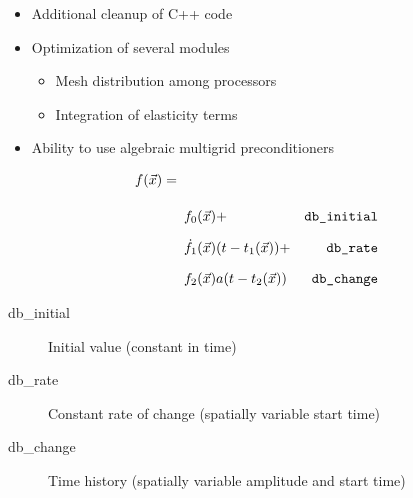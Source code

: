 \documentclass[pdftex,cig,slideColor]{pp4slides}
\begin{document}
  \summary{}

  \begin{itemize}
  \item Additional cleanup of C++ code
  \item Optimization of several modules
    \begin{itemize}
    \item Mesh distribution among processors
    \item Integration of elasticity terms
    \end{itemize}
  \item Ability to use algebraic multigrid preconditioners
 \end{itemize}
    

  
  \begin{equation*}
    \begin{split}
      f(\vec{x}) =& \\[10pt]
      & \begin{array}{lr}
        f_{0}(\vec{x}) + & \textrm{{\tt db\_initial}}\\[10pt]
        \dot{f}_{1}(\vec{x}) (t-t_{1}(\vec{x})) + & \textrm{{\tt db\_rate}}\\[10pt]
        f_{2}(\vec{x})a(t-t_{2}(\vec{x})) & \textrm{{\tt db\_change}}
      \end{array}
    \end{split}
  \end{equation*}
  \vfill
  \begin{description}
  \item[db\_initial] Initial value (constant in time)
  \item[db\_rate] Constant rate of change (spatially variable start time)
  \item[db\_change] Time history (spatially variable amplitude and
    start time)
  \end{description}

 
\end{document}
